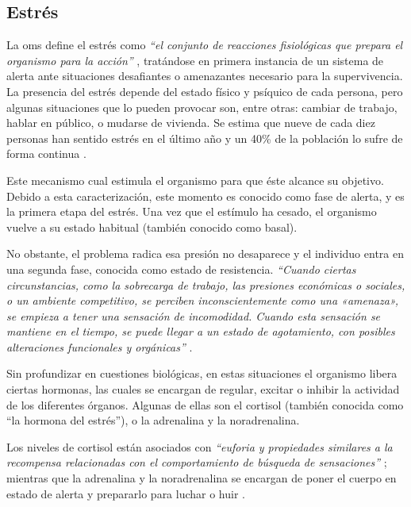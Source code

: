    \subsection{Estrés}
        La \gls{oms} define el estrés como \textit{``el conjunto de reacciones fisiológicas que prepara el organismo para la acción''} \cite{torrades_estres_2007}, tratándose en primera instancia de un sistema de alerta ante situaciones desafiantes o amenazantes necesario para la supervivencia. La presencia del estrés depende del estado físico y psíquico de cada persona, pero algunas situaciones que lo pueden provocar son, entre otras: cambiar de trabajo, hablar en público, o mudarse de vivienda. Se estima que nueve de cada diez personas han sentido estrés en el último año y un 40\% de la población lo sufre de forma continua \cite{nogera_mas_estres_2024}.
        
        Este mecanismo cual estimula el organismo para que éste alcance su objetivo. Debido a esta caracterización, este momento es conocido como fase de alerta, y es la primera etapa del estrés. Una vez que el estímulo ha cesado, el organismo vuelve a su estado habitual (también conocido como basal).
        
        No obstante, el problema radica esa presión no desaparece y el individuo entra en una segunda fase, conocida como estado de resistencia. \textit{``Cuando ciertas circunstancias, como la sobrecarga de trabajo, las presiones económicas o sociales, o un ambiente competitivo, se perciben inconscientemente como una «amenaza», se empieza a tener una sensación de incomodidad. Cuando esta sensación se mantiene en el tiempo, se puede llegar a un estado de agotamiento, con posibles alteraciones funcionales y orgánicas''} \cite{torrades_estres_2007}.

        Sin profundizar en cuestiones biológicas, en estas situaciones el organismo libera ciertas hormonas, las cuales se encargan de regular, excitar o inhibir la actividad de los diferentes órganos. Algunas de ellas son el cortisol (también conocida como ``la hormona del estrés''), o la adrenalina y la noradrenalina. 
        
        Los niveles de cortisol están asociados con \textit{``euforia y propiedades similares a la recompensa relacionadas con el comportamiento de búsqueda de sensaciones''} \cite{currid_efectos_2019}; mientras que la adrenalina y la noradrenalina se encargan de poner el cuerpo en estado de alerta y prepararlo para luchar o huir \cite{torrades_estres_2007}.

